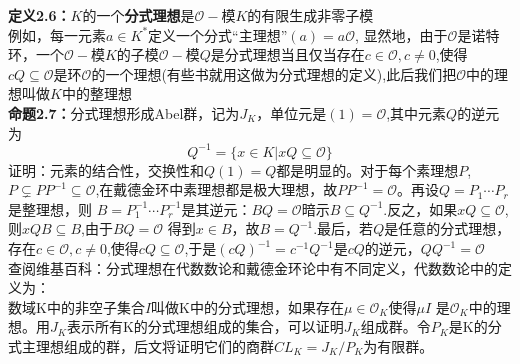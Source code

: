 \documentclass[UTF8]{article}
\begin{document}
    \textbf{定义2.6：}$K$的一个\textbf{分式理想}是$\mathcal{O}-$模$K$的有限生成非零子模\\
    例如，每一元素$a\in K^{*}$定义一个分式“主理想”$(a)=a\mathcal{O}$,
    显然地，由于$\mathcal{O}$是诺特环，一个$\mathcal{O}-$模$K$的子模$\mathcal{O}-$模$Q$是分式理想当且仅当存在$c\in \mathcal{O},c\neq 0$,使得$cQ \subseteq \mathcal{O}$是环$\mathcal{O}$的一个理想(有些书就用这做为分式理想的定义),此后我们把$\mathcal{O}$中的理想叫做$K$中的整理想\\
    \textbf{命题2.7：}分式理想形成Abel群，记为$J_{K}$，单位元是$(1)=\mathcal{O}$,其中元素$Q$的逆元为$$
          Q^{-1}=\{x\in K|xQ \subseteq \mathcal{O} \}
    $$
    证明：元素的结合性，交换性和$Q(1)=Q$都是明显的。对于每个素理想$P$,$P\varsubsetneq PP^{-1}\subseteq  \mathcal{O}$,在戴德金环中素理想都是极大理想，故$PP^{-1}= \mathcal{O}$。再设$Q=P_{1}\cdots P_{r}$是整理想，则
    $B=P_{1}^{-1}\cdots P_{r}^{-1}$是其逆元：$BQ=\mathcal{O}$暗示$B\subseteq Q^{-1}$.反之，如果$xQ \subseteq \mathcal{O}$,则$xQB\subseteq B$,由于$BQ=\mathcal{O}$
    得到$x\in B$，故$B=Q^{-1}$.最后，若$Q$是任意的分式理想，存在$c\in \mathcal{O},c\neq 0$,使得$cQ\subseteq \mathcal{O}$,于是$(cQ)^{-1}=c^{-1}Q^{-1}$是$cQ$的逆元，$QQ^{-1}=\mathcal{O}$\\
    查阅维基百科：分式理想在代数数论和戴德金环论中有不同定义，代数数论中的定义为：\\
    数域K中的非空子集合$I$叫做K中的分式理想，如果存在$\mu\in\mathcal{O}_{K}$使得$\mu I$
    是$\mathcal{O}_{K}$中的理想。用$J_{K}$表示所有K的分式理想组成的集合，可以证明$J_{K}$组成群。令$P_{K}$是K的分式主理想组成的群，后文将证明它们的商群$CL_{K}=J_{K}/P_{K}$为有限群。\\
\end{document}
